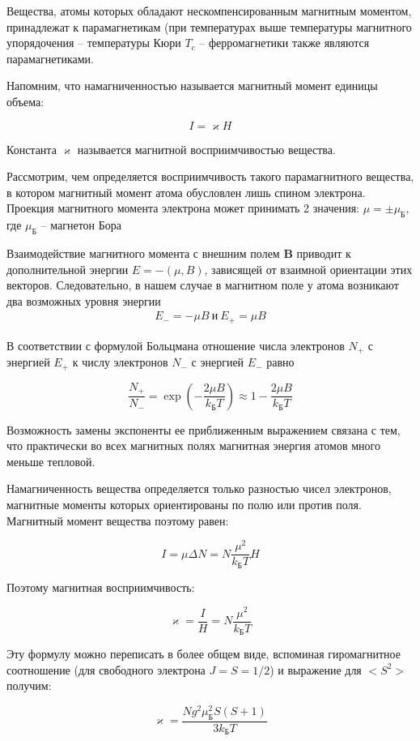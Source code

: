 \documentclass[a4paper,12pt]{article}
\begin{document}
Вещества, атомы которых обладают нескомпенсированным магнитным моментом, принадлежат к парамагнетикам (при температурах выше температуры магнитного упорядочения -- температуры Кюри $T_c$ -- ферромагнетики также являются парамагнетиками. 

Напомним, что намагниченностью называется магнитный момент единицы объема:

$$
	I = \varkappa H
$$

Константа $\varkappa$ называется магнитной восприимчивостью вещества.

Рассмотрим, чем определяется восприимчивость такого парамагнитного вещества, в котором магнитный момент атома обусловлен лишь спином электрона. Проекция магнитного момента электрона может принимать 2 значения: $\mu = \pm \mu_Б$, где $\mu_Б$ -- магнетон Бора

Взаимодействие магнитного момента с внешним полем \textbf{B} приводит к дополнительной энергии $E = - (\mu, B)$, зависящей от взаимной ориентации этих векторов. Следовательно, в нашем случае в магнитном поле у атома возникают два возможных уровня энергии
\begin{align*}
	E_{-} = - \mu B \ и \ E_+ = \mu B 
\end{align*}

В соответствии с формулой Больцмана отношение числа электронов $N_+$ с энергией $E_+$ к числу электронов $N_-$ с энергией $E_-$ равно

$$
	\frac{N_+}{N_-} = \exp \left( -\frac{2 \mu B}{k_Б T} \right) \approx 1 - \frac{2 \mu B}{k_Б T}
$$

Возможность замены экспоненты ее приближенным выражением связана с тем, что практически во всех магнитных полях магнитная энергия атомов много меньше тепловой.

Намагниченность вещества определяется только разностью чисел электронов, магнитные моменты которых ориентированы по полю или против поля. Магнитный момент вещества поэтому равен:

$$
	I = \mu \Delta N = N \frac{\mu^2}{k_Б T} H
$$

Поэтому магнитная восприимчивость:

$$
	\varkappa = \frac{I}{H} =  N \frac{\mu^2}{k_Б T}
$$

Эту формулу можно переписать в более общем виде, вспоминая гиромагнитное соотношение (для свободного электрона $J = S = 1/2$) и выражение для $<S^2>$ получим:

$$
	\varkappa = \frac{N g^2 \mu_Б^2 S(S+1)}{3 k_Б T}
$$
\end{document}
